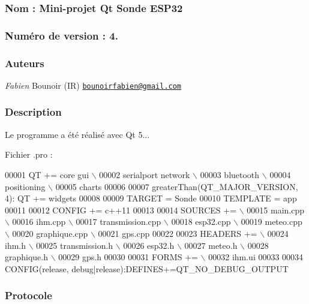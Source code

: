 \subsubsection*{Nom \+: Mini-\/projet Qt Sonde E\+S\+P32}

\subsubsection*{Numéro de version \+: 4.}

\subsubsection*{Auteurs}

{\itshape Fabien} Bounoir (IR) \href{mailto:bounoirfabien@gmail.com}{\tt bounoirfabien@gmail.\+com}

\subsubsection*{Description}

Le programme a été réalisé avec Qt 5...

Fichier {\ttfamily .pro} \+:


\begin{DoxyCode}
00001 QT       += core gui \(\backslash\)
00002             serialport network \(\backslash\)
00003             bluetooth \(\backslash\)
00004             positioning \(\backslash\)
00005             charts
00006 
00007 greaterThan(QT\_MAJOR\_VERSION, 4): QT += widgets
00008 
00009 TARGET = Sonde
00010 TEMPLATE = app
00011 
00012 CONFIG += c++11
00013 
00014 SOURCES += \(\backslash\)
00015         main.cpp \(\backslash\)
00016         ihm.cpp \(\backslash\)
00017     transmission.cpp \(\backslash\)
00018     esp32.cpp \(\backslash\)
00019     meteo.cpp \(\backslash\)
00020     graphique.cpp \(\backslash\)
00021     gps.cpp
00022 
00023 HEADERS += \(\backslash\)
00024         ihm.h \(\backslash\)
00025     transmission.h \(\backslash\)
00026     esp32.h \(\backslash\)
00027     meteo.h \(\backslash\)
00028     graphique.h \(\backslash\)
00029     gps.h
00030 
00031 FORMS += \(\backslash\)
00032         ihm.ui
00033 
00034 CONFIG(release, debug|release):DEFINES+=QT\_NO\_DEBUG\_OUTPUT
\end{DoxyCode}


\subsubsection*{Protocole}


